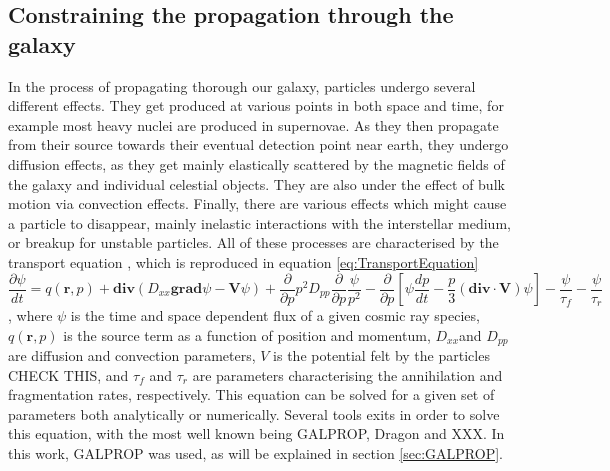 \subsection{Constraining the propagation through the galaxy}\label{sec:Propagation}
In the process of propagating thorough our galaxy, particles undergo several different effects. They get produced at various points in both space and time, for example most heavy nuclei are produced in supernovae. As they then propagate from their source towards their eventual detection point near earth, they undergo diffusion effects, as they get mainly elastically scattered by the magnetic fields of the galaxy and individual celestial objects. They are also under the effect of bulk motion via convection effects. Finally, there are various effects which might cause a particle to disappear, mainly inelastic interactions with the interstellar medium, or breakup for unstable particles. All of these processes are characterised by the transport equation \cite{}, which is reproduced in equation \ref{eq:TransportEquation}
\begin{equation}
    \label{eq:TransportEquation}
    \frac{\partial\psi}{dt} = q(\textbf{r},p) + \mathrm{\textbf{div}}(D_{xx}\mathrm{\textbf{grad}}\psi - \textbf{V}\psi) + \frac{\partial}{\partial p}p^2D_{pp} \frac{\partial}{\partial p}\frac{\psi}{p^2} - \frac{\partial}{\partial p} \left[ \psi \frac{dp}{d t}   -\frac{p}{3} (\mathrm{\textbf{div}}\cdot  \mathrm{\textbf{V}} )\psi              \right] - \frac{\psi}{\tau_f}-\frac{\psi}{\tau_r}
\end{equation}
, where $\psi$ is the time and space dependent flux of a given cosmic ray species, $q(\textbf{r},p)$ is the source term as a function of position and momentum, $D_{xx}$and $D_{pp}$ are diffusion and convection parameters, $V$ is the potential felt by the particles CHECK THIS, and $\tau_f$ and $\tau_r$ are parameters characterising the annihilation and fragmentation rates, respectively. This equation can be solved for a given set of parameters both analytically or numerically. Several tools exits in order to solve this equation, with the most well known being GALPROP\cite{}, Dragon \cite{} and XXX. In this work, GALPROP was used, as will be explained in section \ref{sec:GALPROP}. \\

